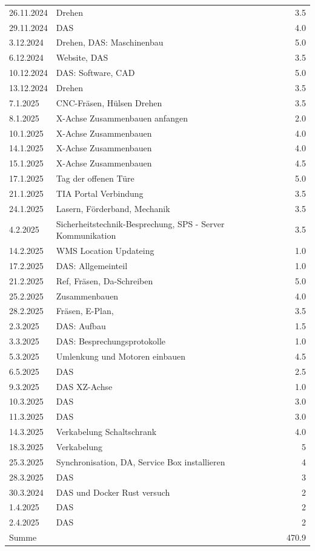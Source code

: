 \begin{longtable}{|l|p{10cm}|r|}
26.11.2024	&Drehen& 3.5\\
29.11.2024	&DAS& 4.0\\
3.12.2024	&Drehen, DAS: Maschinenbau& 5.0\\
6.12.2024	&Website, DAS &3.5\\
10.12.2024	&DAS: Software, CAD	&5.0\\
13.12.2024	&Drehen &3.5\\
7.1.2025	&CNC-Fräsen, Hülsen Drehen&	3.5\\
8.1.2025	&X-Achse Zusammenbauen anfangen	&2.0\\
10.1.2025	&X-Achse Zusammenbauen	&4.0\\
14.1.2025	&X-Achse Zusammenbauen &	4.0\\
15.1.2025	&X-Achse Zusammenbauen &	4.5\\
17.1.2025	&Tag der offenen Türe	&5.0\\
21.1.2025	&TIA Portal Verbindung&	3.5\\
24.1.2025	&Lasern, Förderband, Mechanik	&3.5\\
4.2.2025	&Sicherheitstechnik-Besprechung, SPS - Server Kommunikation	&3.5\\
14.2.2025	&WMS Location Updateing	&1.0\\
17.2.2025	&DAS: Allgemeinteil	&1.0\\
21.2.2025	&Ref, Fräsen, Da-Schreiben	&5.0\\
25.2.2025	&Zusammenbauen&	4.0\\
28.2.2025	&Fräsen, E-Plan,&	3.5\\
2.3.2025	&DAS: Aufbau	&1.5\\
3.3.2025	&DAS: Besprechungsprotokolle&	1.0\\
5.3.2025	&Umlenkung und Motoren einbauen&	4.5\\
6.5.2025	&DAS  &	2.5\\
9.3.2025	&DAS XZ-Achse	&1.0\\
10.3.2025	&DAS	&3.0\\
11.3.2025	&DAS	&3.0\\
14.3.2025	&Verkabelung Schaltschrank	&4.0\\
18.3.2025   &Verkabelung & 5\\
25.3.2025	&Synchronisation, DA, Service Box installieren& 4\\
28.3.2025	&DAS& 3\\
30.3.2024  &DAS und Docker Rust versuch &2\\
1.4.2025& DAS &2\\
2.4.2025& DAS &2\\


\hline
\hline
Summe & & 470.9 \\

\end{longtable}
\newpage

